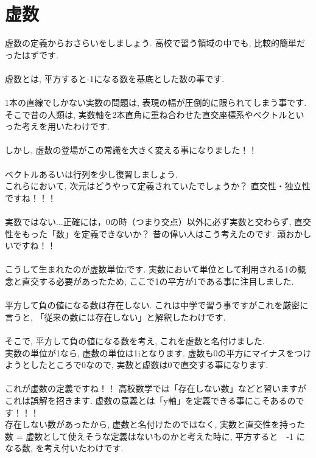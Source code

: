 \documentclass[11pt,a4paper,uplatex]{ujreport}
\begin{document}
\section{虚数}
虚数の定義からおさらいをしましょう. 高校で習う領域の中でも, 比較的簡単だったはずです.\\
\\
虚数とは, 平方すると-1になる数を基底とした数の事です.\\
\\
1本の直線でしかない実数の問題は, 表現の幅が圧倒的に限られてしまう事です. そこで昔の人類は, 実数軸を2本直角に重ね合わせた直交座標系やベクトルといった考えを用いたわけです.\\
\\
しかし, 虚数の登場がこの常識を大きく変える事になりました！！\\
\\
ベクトルあるいは行列を少し復習しましょう.\\
これらにおいて, 次元はどうやって定義されていたでしょうか？ 直交性・独立性ですね！！！\\
\\
実数ではない...正確には，0の時（つまり交点）以外に必ず実数と交わらず, 直交性をもった「数」を定義できないか？
昔の偉い人はこう考えたのです. 頭おかしいですね！！\\
\\
こうして生まれたのが虚数単位iです. 実数において単位として利用される1の概念と直交する必要があったため, ここで1の平方が1である事に注目しました. \\
\\
平方して負の値になる数は存在しない. これは中学で習う事ですがこれを厳密に言うと, 「従来の数には存在しない」と解釈したわけです.\\
\\
そこで, 平方して負の値になる数を考え, これを虚数と名付けました.\\
実数の単位が1なら, 虚数の単位は1iとなります. 虚数も0の平方にマイナスをつけようとしたところで0なので, 実数と虚数は0で直交する事になります.\\
\\
これが虚数の定義ですね！！ 高校数学では「存在しない数」などと習いますがこれは誤解を招きます. 虚数の意義とは「y軸」を定義できる事にこそあるのです！！！\\
存在しない数があったから, 虚数と名付けたのではなく, 実数と直交性を持った数 = 虚数として使えそうな定義はないものかと考えた時に, 平方すると　-1 になる数, を考え付いたわけです.
\end{document}
